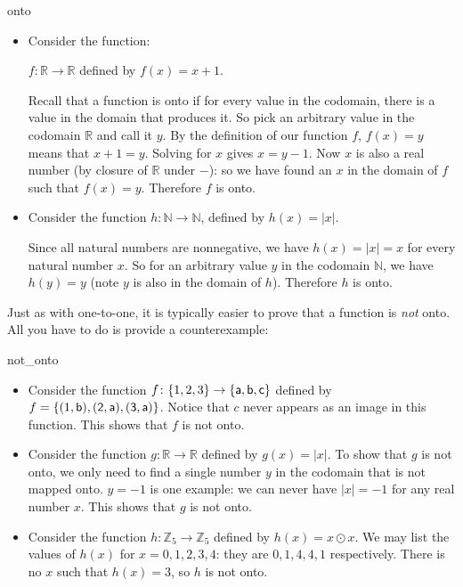 \begin{example}{onto}
\begin{itemize}
\item
 Consider the  function:

$f\colon \mathbb{R} \to \mathbb{R}$ defined by $f(x)=x +1$.

Recall that a function is onto if for every value in the codomain, there is a value in the domain that produces it.  
So pick an arbitrary value in the codomain $\mathbb{R}$ and call it $y$.  By the definition of our function $f$, $f(x)=y$ means that $x+1=y$.  Solving for $x$ gives $x = y - 1$.  Now $x$ is also a real number (by  closure of $\mathbb{R}$ under $-$): so we have found an $x$ in the domain of $f$ such that  $f(x) = y$.  Therefore $f$ is onto.

\item 
Consider the function 
$h\colon \mathbb{N} \to \mathbb{N}$, defined by $h(x)=|x|$.

Since all natural numbers are nonnegative, we have $h(x)=|x|=x$ for every natural number $x$.  So for an arbitrary value $y$ in the codomain $\mathbb{N}$, we have $h(y) = y$ (note $y$ is also in the domain of $h$). Therefore $h$ is onto.
\end{itemize}

\end{example}

Just as with one-to-one, it is typically easier to prove that a function is \emph{not} onto. All you have to do is provide a counterexample:

\begin{example}{not_onto} 
\begin{itemize}
\item
Consider the function $f\colon \{1,2,3\} \to \{\sf{a}, \sf{b},\sf{c}\}$ defined by $f=\{(1,\sf{b}),(2,\sf{a}),(3,\sf{a})\}$.
Notice that $c$ never appears as an image in this function.  This shows that $f$ is not onto. 
\item
Consider the function $g\colon \mathbb{R} \to \mathbb{R}$ defined by $g(x)= |x|$. To show that $g$ is not onto, we only need to find a single number $y$ in the codomain that  is not mapped onto.  $y=-1$ is one example: we can never have $|x|=-1$ for any real number $x$.  This shows that $g$ is not onto.
\item
Consider the function $h\colon \mathbb{Z}_5 \to \mathbb{Z}_5$ defined by $h(x)= x \odot x $. We may list the values of $h(x)$ for $x = 0,1,2,3,4$: they are $0,1,4,4,1$ respectively. There is no $x$ such that $h(x) = 3$, so $h$ is not onto.
\end{itemize}
\end{example}


